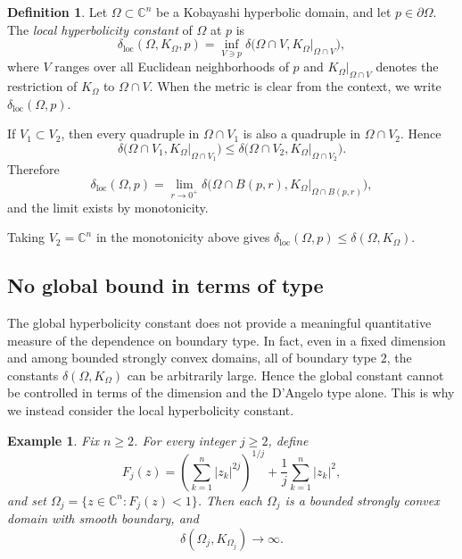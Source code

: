 \documentclass[11pt]{article}
\newtheorem{example}[theorem]{Example}
\theoremstyle{definition}
\newtheorem{definition}[theorem]{Definition}
\newcommand{\C}{\mathbb{C}}
\begin{document}
\begin{definition}\label{def:local-hyperbolicity-constant}
Let \(\Omega\subset\C^n\) be a Kobayashi hyperbolic domain, and let
\(p\in\partial\Omega\).  The \emph{local hyperbolicity constant} of
\(\Omega\) at \(p\) is
\begin{equation*}
\delta_{\mathrm{loc}}(\Omega,K_\Omega,p)
=
\inf_{V\ni p}
\delta\bigl(
\Omega\cap V,
\left.K_\Omega\right|_{\Omega\cap V}
\bigr),
\end{equation*}
where \(V\) ranges over all Euclidean neighborhoods of \(p\) and
\(\left.K_\Omega\right|_{\Omega\cap V}\) denotes the restriction of
\(K_\Omega\) to \(\Omega\cap V\).
When the metric is clear from the context, we write
\(\delta_{\mathrm{loc}}(\Omega,p)\).
\end{definition}

If \(V_1\subset V_2\), then every quadruple in \(\Omega\cap V_1\) is
also a quadruple in \(\Omega\cap V_2\).  Hence
\[
\delta\bigl(
\Omega\cap V_1,
\left.K_\Omega\right|_{\Omega\cap V_1}
\bigr)
\le
\delta\bigl(
\Omega\cap V_2,
\left.K_\Omega\right|_{\Omega\cap V_2}
\bigr).
\]
Therefore
\[
\delta_{\mathrm{loc}}(\Omega,p)
=
\lim_{r\to0^+}
\delta\bigl(
\Omega\cap B(p,r),
\left.K_\Omega\right|_{\Omega\cap B(p,r)}
\bigr),
\]
and the limit exists by monotonicity.

Taking \(V_2=\C^n\) in the monotonicity above gives
\(\delta_{\mathrm{loc}}(\Omega,p)\le\delta(\Omega,K_\Omega)\).

\subsection{No global bound in terms of type}

The global hyperbolicity constant does not provide a meaningful
quantitative measure of the dependence on boundary type.  In fact, even
in a fixed dimension and among bounded strongly convex domains, all of
boundary type \(2\), the constants
\(\delta(\Omega,K_\Omega)\) can be arbitrarily large.  Hence the global
constant cannot be controlled in terms of the dimension and the
D'Angelo type alone.  This is why we instead consider the local
hyperbolicity constant.

\begin{example}\label{ex:no-global-bound}
Fix \(n\ge2\).  For every integer \(j\ge2\), define
\[
F_j(z)
=
\left(\sum_{k=1}^n |z_k|^{2j}\right)^{1/j}
+
\frac1j\sum_{k=1}^n |z_k|^2,
\]
and set
\(\Omega_j=\{z\in\C^n:F_j(z)<1\}\).
Then each \(\Omega_j\) is a bounded strongly convex domain with smooth
boundary, and
\[
\delta(\Omega_j,K_{\Omega_j})\longrightarrow\infty.
\]
\end{example}
\end{document}
